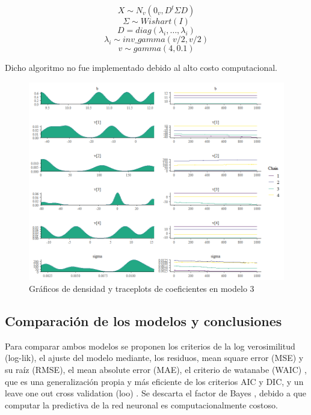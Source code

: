 \documentclass[nojss]{jss}
\begin{document}
$$X \sim N_v(0_v,D^t\Sigma D)$$
$$\Sigma  \sim Wishart(I)$$
$$D = diag(\lambda_i,\ldots,\lambda_i)$$
$$\lambda_i \sim inv\_gamma(v/2,v/2)$$
$$v \sim gamma(4,0.1)$$

Dicho algoritmo no fue implementado debido al alto costo computacional.


\begin{figure}[H]
	\centering
	\includegraphics[scale=0.8]{images/traceplot3}
	\caption[trace3]{Gráficos de densidad y traceplots de coeficientes en modelo 3}
	\label{fig:fig8}
\end{figure}


\subsection{Comparación de los modelos y conclusiones}

Para comparar ambos modelos se proponen los criterios de la log verosimilitud (log-lik), el ajuste del modelo mediante, los residuos, mean square error (MSE) y su raíz (RMSE), el mean absolute error (MAE), el criterio de watanabe (WAIC) \cite{watanabe}, que es una generalización propia y más eficiente de los criterios AIC y DIC,  y un leave one out cross validation (loo) \cite{loo}.  Se descarta el factor de Bayes \cite{bayesfactor}, debido a que computar la predictiva de la red neuronal es computacionalmente costoso.\\
\end{document}
